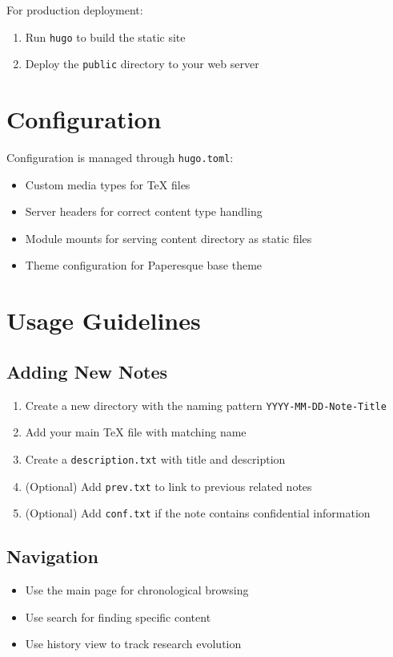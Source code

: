 \documentclass{article}
\begin{document}
For production deployment:
\begin{enumerate}
  \item Run \texttt{hugo} to build the static site
  \item Deploy the \texttt{public} directory to your web server
\end{enumerate}

\section{Configuration}

Configuration is managed through \texttt{hugo.toml}:

\begin{itemize}
  \item Custom media types for TeX files
  \item Server headers for correct content type handling
  \item Module mounts for serving content directory as static files
  \item Theme configuration for Paperesque base theme
\end{itemize}

\section{Usage Guidelines}

\subsection{Adding New Notes}
\begin{enumerate}
  \item Create a new directory with the naming pattern \texttt{YYYY-MM-DD-Note-Title}
  \item Add your main TeX file with matching name
  \item Create a \texttt{description.txt} with title and description
  \item (Optional) Add \texttt{prev.txt} to link to previous related notes
  \item (Optional) Add \texttt{conf.txt} if the note contains confidential information
\end{enumerate}

\subsection{Navigation}
\begin{itemize}
  \item Use the main page for chronological browsing
  \item Use search for finding specific content
  \item Use history view to track research evolution
\end{itemize}
\end{document}
